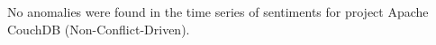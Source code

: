 \documentclass[12pt,letterpaper]{gthesis2}  %
\begin{document}
No anomalies were found in the time series of sentiments for project Apache CouchDB (Non-Conflict-Driven). \\


%
%
%
%
%
%

%

\end{document}
